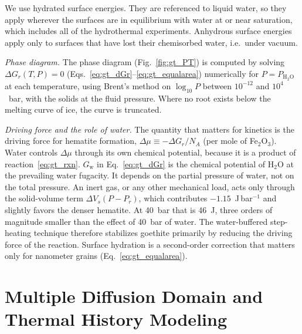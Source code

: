 We use hydrated surface energies. They are referenced to liquid water, so they apply wherever the
surfaces are in equilibrium with water at or near saturation, which includes all of the
hydrothermal experiments. Anhydrous surface energies apply only to surfaces that have lost their
chemisorbed water, i.e.\ under vacuum.

\textit{Phase diagram.} The phase diagram (Fig.~\ref{fig:gt_PT}) is computed by solving
$\Delta G_r(T,P) = 0$ (Eqs.~\eqref{eq:gt_dGr}--\eqref{eq:gt_equalarea}) numerically for
$P = P_{\mathrm{H_2O}}$ at each temperature, using Brent's method on $\log_{10}P$ between
$10^{-12}$ and $10^{4}$~bar, with the solids at the fluid pressure. Where no root exists below the
melting curve of ice, the curve is truncated.

\textit{Driving force and the role of water.} The quantity that matters for kinetics is the
driving force for hematite formation, $\Delta\mu \equiv -\Delta G_r/N_A$ (per mole of Fe$_2$O$_3$).
Water controls $\Delta\mu$ through its own chemical potential, because it is a product of
reaction~\eqref{eq:gt_rxn}. $G_{\mathrm{w}}$ in Eq.~\eqref{eq:gt_dGr} is the chemical potential of
H$_2$O at the prevailing water fugacity. It depends on the partial pressure of water, not on the
total pressure. An inert gas, or any other mechanical load, acts only through the solid-volume
term $\Delta V_s(P-P_r)$, which contributes $-1.15$~J\,bar$^{-1}$ and slightly favors the denser
hematite. At 40~bar that is 46~J, three orders of magnitude smaller than the effect of 40~bar of
water. The water-buffered step-heating technique therefore stabilizes goethite primarily by
reducing the driving force of the reaction. Surface hydration is a second-order correction that matters
only for nanometer grains (Eq.~\eqref{eq:gt_equalarea}).


\section{Multiple Diffusion Domain and Thermal History Modeling}\label{sec:ch2-si-mdd}

